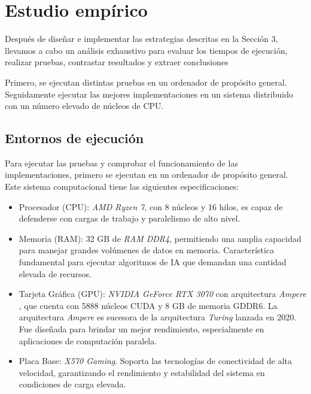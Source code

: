 


\chapter{Estudio empírico}
\label{cap:c4_estudio}	
Después de diseñar e implementar las estrategias descritas en la Sección 3, llevamos a cabo un análisis exhaustivo para evaluar los tiempos de ejecución, realizar pruebas, contrastar resultados y extraer conclusiones

Primero, se ejecutan distintas pruebas en un ordenador de propósito general. Seguidamente ejecutar las mejores implementaciones en un sistema distribuido con un número elevado de núcleos de CPU. 

\section{Entornos de ejecución}

Para ejecutar las pruebas y comprobar el funcionamiento de las implementaciones, primero se ejecutan en un ordenador de propósito general. Este sistema computacional tiene las siguientes especificaciones:

\begin{itemize}
	\item Procesador (CPU): \textit{AMD Ryzen 7}, con 8 núcleos y 16 hilos, es capaz de defenderse con cargas de trabajo y paralelismo de alto nivel.
	\item Memoria (RAM): 32 GB de \textit{RAM DDR4}, permitiendo una amplia capacidad para manejar grandes volúmenes de datos en memoria. Característica fundamental para ejecutar algoritmos de IA que demandan una cantidad elevada de recursos.
	\item Tarjeta Gráfica (GPU): \textit{NVIDIA GeForce RTX 3070} con arquitectura \textit{Ampere} \cite{pool2020accelerating}, que cuenta con 5888 núcleos CUDA y 8 GB de memoria GDDR6. La arquitectura \textit{Ampere} es sucesora de la arquitectura \textit{Turing} lanzada en 2020. Fue diseñada para brindar un mejor rendimiento, especialmente en aplicaciones de computación paralela.
	\item Placa Base: \textit{X570 Gaming}. Soporta las tecnologías de conectividad de alta velocidad, garantizando el rendimiento y estabilidad del sistema en condiciones de carga elevada.
\end{itemize}

